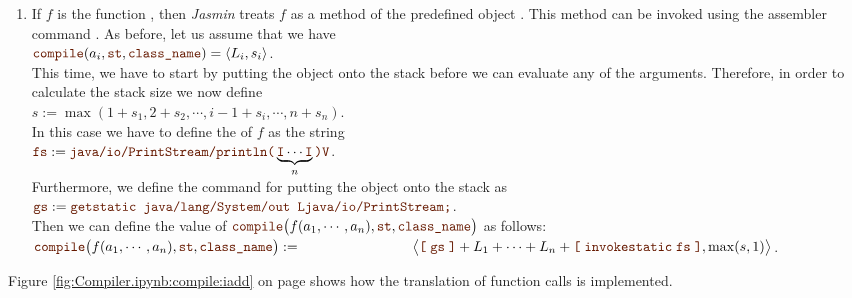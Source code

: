 \begin{enumerate}
\item If $f$ is the function , then \textsl{Jasmin} treats $f$ as a method of the
      predefined object .
      This method can be invoked using the assembler command
      .  As before, let us assume that we have
      \\[0.2cm]
      \hspace*{1.3cm}
      $\mytt{compile}(a_i, \mytt{st}, \mytt{class\_name}) = \pair(L_i, s_i)$.
      \\[0.2cm]
      This time, we have to start by putting the object  onto the stack before we
      can evaluate any of the arguments.  Therefore, in order to calculate the stack size we now define
      \\[0.2cm]
      \hspace*{1.3cm}
      $s := \max(1 + s_1, 2 + s_2, \cdots, i - 1 + s_i, \cdots, n + s_n)$.
      \\[0.2cm]
      In this case we have to define the  of $f$ as the string
      \\[0.2cm]
      \hspace*{1.3cm}
      $\mytt{fs} := \mytt{java/io/PrintStream/println(}\underbrace{\mytt{I}\cdots\mytt{I}}_{n}\mytt{)V}$.
      \\[0.2cm]
      Furthermore, we define the command  for putting the object  onto the
      stack as 
      \\[0.2cm]
      \hspace*{1.3cm}
      $\mytt{gs} :=  \mytt{getstatic java/lang/System/out Ljava/io/PrintStream;}$.
      \\[0.2cm]
      Then we can define the
      value of
      $\mytt{compile}\bigl(f(a_1,\cdots,a_n), \mytt{st}, \mytt{class\_name}\bigr)$ as follows:
      \\[0.2cm]
      \hspace*{1.3cm}
      $\mytt{compile}\bigl(f(a_1,\cdots,a_n), \mytt{st}, \mytt{class\_name}\bigr) := \\[0.1cm]
      \hspace*{2.8cm} \bigl\langle \mytt{[} \;\mytt{gs} \;\mytt{]} + L_1 + \cdots + L_n +
                   \mytt{[} \; \mytt{invokestatic}\; \mytt{fs} \;\mytt{]}, \max(s,1)\bigr\rangle$.
      \end{enumerate}

Figure \ref{fig:Compiler.ipynb:compile:iadd} on page \pageref{fig:Compiler.ipynb:compile:iadd} shows how the
translation of function calls is implemented.  

